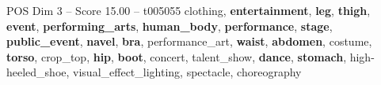 \begin{textsample}{POS Dim 3 – Score 15.00 – t005055}  \label{ex:f3_pos_025}
clothing, \textbf{entertainment}, \textbf{leg}, \textbf{thigh}, \textbf{event}, \textbf{performing\_arts}, \textbf{human\_body}, \textbf{performance}, \textbf{stage}, \textbf{public\_event}, \textbf{navel}, \textbf{bra}, performance\_art, \textbf{waist}, \textbf{abdomen}, costume, \textbf{torso}, crop\_top, \textbf{hip}, \textbf{boot}, concert, talent\_show, \textbf{dance}, \textbf{stomach}, high-heeled\_shoe, visual\_effect\_lighting, spectacle, choreography

\end{textsample}
